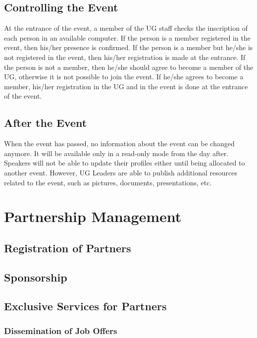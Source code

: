 \documentclass[envcountsame,envcountchap]{svmono}
\begin{document}
\section{Controlling the Event}

At the entrance of the event, a member of the UG staff checks the inscription of each person in an available computer. If the person is a member registered in the event, then his/her presence is confirmed. If the person is a member but he/she is not registered in the event, then his/her registration is made at the entrance. If the person is not a member, then he/she should agree to become a member of the UG, otherwise it is not possible to join the event. If he/she agrees to become a member, his/her registration in the UG and in the event is done at the entrance of the event.

\section{After the Event}

When the event has passed, no information about the event can be changed anymore. It will be available only in a read-only mode from the day after. Speakers will not be able to update their profiles either until being allocated to another event. However, UG Leaders are able to publish additional resources related to the event, such as pictures, documents, presentations, etc.

\chapter{Partnership Management}

\section{Registration of Partners}

\section{Sponsorship}

\section{Exclusive Services for Partners}

\subsection{Dissemination of Job Offers}
\end{document}
